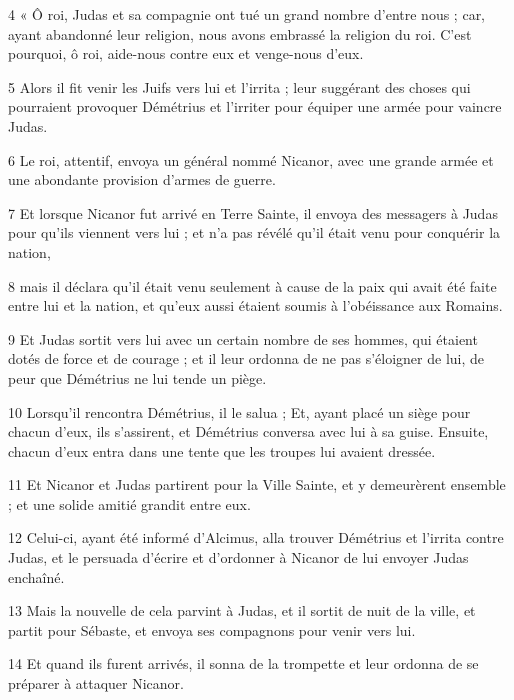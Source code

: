 \par 4 « Ô roi, Judas et sa compagnie ont tué un grand nombre d'entre nous ; car, ayant abandonné leur religion, nous avons embrassé la religion du roi. C'est pourquoi, ô roi, aide-nous contre eux et venge-nous d'eux.

\par 5 Alors il fit venir les Juifs vers lui et l'irrita ; leur suggérant des choses qui pourraient provoquer Démétrius et l'irriter pour équiper une armée pour vaincre Judas.

\par 6 Le roi, attentif, envoya un général nommé Nicanor, avec une grande armée et une abondante provision d'armes de guerre.

\par 7 Et lorsque Nicanor fut arrivé en Terre Sainte, il envoya des messagers à Judas pour qu'ils viennent vers lui ; et n'a pas révélé qu'il était venu pour conquérir la nation,

\par 8 mais il déclara qu'il était venu seulement à cause de la paix qui avait été faite entre lui et la nation, et qu'eux aussi étaient soumis à l'obéissance aux Romains.

\par 9 Et Judas sortit vers lui avec un certain nombre de ses hommes, qui étaient dotés de force et de courage ; et il leur ordonna de ne pas s'éloigner de lui, de peur que Démétrius ne lui tende un piège.

\par 10 Lorsqu'il rencontra Démétrius, il le salua ; Et, ayant placé un siège pour chacun d'eux, ils s'assirent, et Démétrius conversa avec lui à sa guise. Ensuite, chacun d'eux entra dans une tente que les troupes lui avaient dressée.

\par 11 Et Nicanor et Judas partirent pour la Ville Sainte, et y demeurèrent ensemble ; et une solide amitié grandit entre eux.

\par 12 Celui-ci, ayant été informé d'Alcimus, alla trouver Démétrius et l'irrita contre Judas, et le persuada d'écrire et d'ordonner à Nicanor de lui envoyer Judas enchaîné.

\par 13 Mais la nouvelle de cela parvint à Judas, et il sortit de nuit de la ville, et partit pour Sébaste, et envoya ses compagnons pour venir vers lui.

\par 14 Et quand ils furent arrivés, il sonna de la trompette et leur ordonna de se préparer à attaquer Nicanor.

